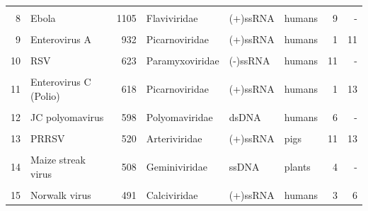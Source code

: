 \documentclass[landscape]{slides}
\begin{document}
\begin{slide}
\begin{center}
\begin{tabular}{r|l|r|l|l|l|r|r}
       &                    &              &                &          &        &       &          \\ 
     8 & Ebola              &        1105  & Flaviviridae   & (+)ssRNA & humans &     9 &       -  \\
       &                    &              &                &          &        &       &          \\ 
     9 & Enterovirus A      &         932  & Picarnoviridae & (+)ssRNA & humans &     1 &      11  \\
       &                    &              &                &          &        &       &          \\ 
    10 & RSV                &         623  & Paramyxoviridae& (-)ssRNA & humans &    11 &       -  \\
       &                    &              &                &          &        &       &          \\ 
    11 & Enterovirus C (Polio) &      618  & Picarnoviridae & (+)ssRNA & humans &     1 &      13  \\
       &                    &              &                &          &        &       &          \\ 
    12 & JC polyomavirus    &          598 & Polyomaviridae & dsDNA    & humans &     6 &       -  \\
       &                    &              &                &          &        &       &          \\ 
    13 & PRRSV              &          520 & Arteriviridae  & (+)ssRNA & pigs   &    11 &      13  \\ %
       &                    &              &                &          &        &       &          \\ 
    14 & Maize streak virus &          508 & Geminiviridae  & ssDNA    & plants &     4 &      -   \\
       &                    &              &                &          &        &       &          \\ 
    15 & Norwalk virus      &          491 &  Calciviridae  & (+)ssRNA & humans &     3 &       6  \\ 
\end{tabular}


\end{center}
\end{slide}
\end{document}

